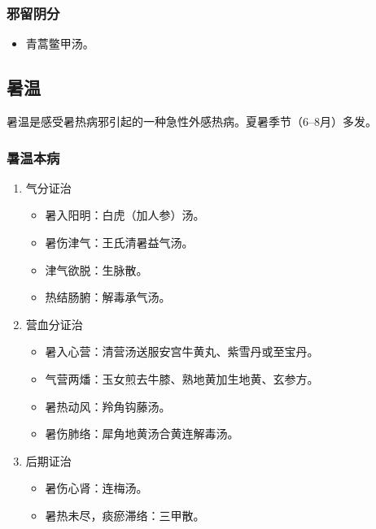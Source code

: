 \documentclass[cn,black,12pt,founder,normal,twocolumn]{elegantnote}
\begin{document}
\subsubsection{邪留阴分}

\begin{itemize}
    \item 青蒿鳖甲汤。
\end{itemize}

\subsection{暑温}

暑温是感受暑热病邪引起的一种急性外感热病。夏暑季节（6--8月）多发。

\subsubsection{暑温本病}

\begin{enumerate}
    \item 气分证治
    \begin{itemize}
        \item 暑入阳明：白虎（加人参）汤。
        \item 暑伤津气：王氏清暑益气汤。
        \item 津气欲脱：生脉散。
        \item 热结肠腑：解毒承气汤。
    \end{itemize}
    \item 营血分证治
    \begin{itemize}
        \item 暑入心营：清营汤送服安宫牛黄丸、紫雪丹或至宝丹。
        \item 气营两燔：玉女煎去牛膝、熟地黄加生地黄、玄参方。
        \item 暑热动风：羚角钩藤汤。
        \item 暑伤肺络：犀角地黄汤合黄连解毒汤。
    \end{itemize}
    \item 后期证治
    \begin{itemize}
        \item 暑伤心肾：连梅汤。
        \item 暑热未尽，痰瘀滞络：三甲散。
    \end{itemize}
\end{enumerate}
\end{document}
